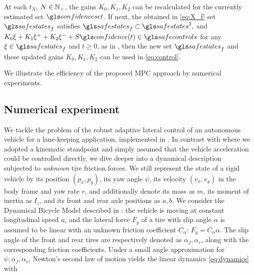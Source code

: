 \begin{remark}
	\begin{leftbar}[remarkbar]
	At each $t_{N}$, $N\in\mathbb{N}_{+}$, the gains $K_{0},K_{1},K_{2}$
	can be recalculated for the currently estimated set $\confidenceset$.
	If next, the obtained in \eqref{eq:X_f} set $\safestates_{f}$ satisfies 
	$
	\safestates_{f}\subset\safestates^{2},
	$
	and
	$
	K_{0}\xi+K_{1}\xi^{+}+K_{2}\xi^{-}+S\confidence(t)\in\safecontrols
	$
	for any $\xi\in\safestates_{f}$ and $t\geq0$, as in ,
	then the new set $\safestates_{f}$ and these updated gains $K_{0},K_{1},K_{2}$
	can be used in \eqref{eq:control}.
	\end{leftbar}
\end{remark}

We illustrate the efficiency of the proposed \gls{MPC} approach by numerical
experiments.

\subsection{Numerical experiment}

We tackle the problem of the robust adaptive lateral control of an autonomous vehicle for a lane-keeping application, implemented in \highwayenv. In contrast with  where we adopted a kinematic standpoint and simply assumed that the vehicle acceleration could be controlled directly, we dive deeper into a dynamical description subjected to \emph{unknown} tire friction forces. We still represent the state of a rigid vehicle by its position $(p_x, p_y)$, its yaw angle $\psi$, its velocity $(v_x, v_y)$ in the body frame and yaw rate $r$, and additionally denote its mass as $m$, its moment of inertia as $I_z$, and its front and rear axle positions as $a,b$. We consider the Dynamical Bicycle Model described in \citep[, Chapter 3.2]{awan2014compensation}: the vehicle is moving at constant longitudinal speed $u$, and the lateral force $F_y$ of a tire with slip angle $\alpha$ is assumed to be linear with an unknown friction coefficient $C_\alpha$: $F_y = C_\alpha \alpha$. The slip angle of the front and rear tires are respectively denoted as $\alpha_f, \alpha_r$, along with the corresponding friction coefficients.
Under a small angle approximation for $\psi, \alpha_f, \alpha_r$, Newton's second law of motion yields the linear dynamics \eqref{eq:dynamics} with

